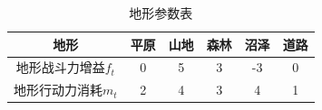 \documentclass[a4paper,4pt]{article}
\begin{document}
\begin{table}[htbp]
  \centering
  \caption{地形参数表}
    \begin{tabular}{c|c|c|c|c|c}
    \hline
    地形 & 平原 & 山地 & 森林 & 沼泽 & 道路 \bigstrut\\
    \hline
    地形战斗力增益$f_t$ & 0  & 5  & 3  & -3 & 0 \bigstrut\\
    \hline
    地形行动力消耗$m_t$ & 2  & 4  & 3  & 4  & 1 \bigstrut\\
    \hline
    \end{tabular}%
    \label{地形}%
\end{table}%
\end{document}
